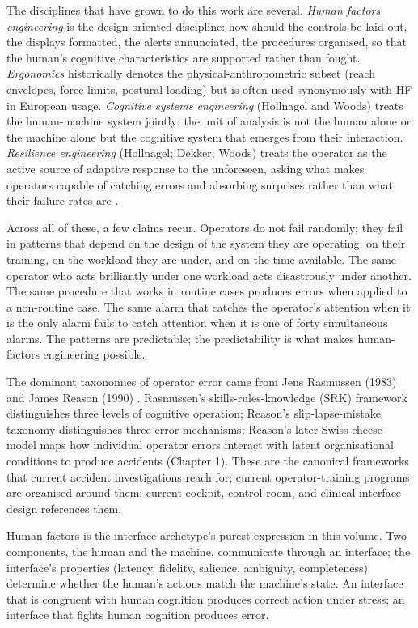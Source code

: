 The disciplines that have grown to do this work are several. \emph{Human factors engineering} is the design-oriented discipline: how should the controls be laid out, the displays formatted, the alerts annunciated, the procedures organised, so that the human's cognitive characteristics are supported rather than fought. \emph{Ergonomics} historically denotes the physical-anthropometric subset (reach envelopes, force limits, postural loading) but is often used synonymously with HF in European usage. \emph{Cognitive systems engineering} (Hollnagel and Woods) treats the human-machine system jointly: the unit of analysis is not the human alone or the machine alone but the cognitive system that emerges from their interaction. \emph{Resilience engineering} (Hollnagel; Dekker; Woods) treats the operator as the active source of adaptive response to the unforeseen, asking what makes operators capable of catching errors and absorbing surprises rather than what their failure rates are \cite{text:hollnagel-erik-2014}.

Across all of these, a few claims recur. Operators do not fail randomly; they fail in patterns that depend on the design of the system they are operating, on their training, on the workload they are under, and on the time available. The same operator who acts brilliantly under one workload acts disastrously under another. The same procedure that works in routine cases produces errors when applied to a non-routine case. The same alarm that catches the operator's attention when it is the only alarm fails to catch attention when it is one of forty simultaneous alarms. The patterns are predictable; the predictability is what makes human-factors engineering possible.

The dominant taxonomies of operator error came from Jens Rasmussen (1983) and James Reason (1990) \cite{paper:rasmussen-skills-rules-knowledge-1983,text:reason-human-error-1990}. Rasmussen's skills-rules-knowledge (SRK) framework distinguishes three levels of cognitive operation; Reason's slip-lapse-mistake taxonomy distinguishes three error mechanisms; Reason's later Swiss-cheese model maps how individual operator errors interact with latent organisational conditions to produce accidents (Chapter 1). These are the canonical frameworks that current accident investigations reach for; current operator-training programs are organised around them; current cockpit, control-room, and clinical interface design references them.

\begin{archetype}[interface]
Human factors is the interface archetype's purest expression in this volume. Two components, the human and the machine, communicate through an interface; the interface's properties (latency, fidelity, salience, ambiguity, completeness) determine whether the human's actions match the machine's state. An interface that is congruent with human cognition produces correct action under stress; an interface that fights human cognition produces error.
\end{archetype}

